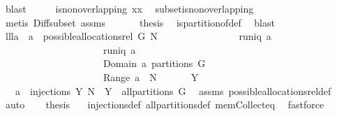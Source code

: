 \begin{isabellebody}
\ blast\isanewline
\ \ \isamarkupfalse%
\ \isamarkupfalse%
\ {\isachardoublequoteopen}is{\isacharunderscore}non{\isacharunderscore}overlapping\ {\isacharquery}xx{\isachardoublequoteclose}\ \isamarkupfalse%
\ subset{\isacharunderscore}is{\isacharunderscore}non{\isacharunderscore}overlapping\ \isamarkupfalse%
\ {\isacharparenleft}metis\ Diff{\isacharunderscore}subset\ assms{\isacharparenleft}{}{\isacharparenright}{\isacharparenright}\isanewline
\ \ \isamarkupfalse%
\isanewline
\ \ \isamarkupfalse%
\ {\isacharquery}thesis\ \isamarkupfalse%
\ is{\isacharunderscore}partition{\isacharunderscore}of{\isacharunderscore}def\ \isamarkupfalse%
\ blast\isanewline
{}\isamarkupfalse%
%
\endisatagproof
{\isafoldproof}%
%
\isadelimproof
\isanewline
%
\endisadelimproof
\isanewline
{}\isamarkupfalse%
\ lll{}{}a{\isacharcolon}\ \ {\isachardoublequoteopen}a\ {\isasymin}\ possible{\isacharunderscore}allocations{\isacharunderscore}rel\ G\ N{\isachardoublequoteclose}\ \isanewline
\ \ \ \ \ \ \ \ \ \ \ \ \ \ \ {\isachardoublequoteopen}runiq\ a\ {\isacharampersand}\ \isanewline
\ \ \ \ \ \ \ \ \ \ \ \ \ \ \ \ \ \ \ \ \ runiq\ {\isacharparenleft}a{\isasyminverse}{\isacharparenright}\ {\isacharampersand}\ \isanewline
\ \ \ \ \ \ \ \ \ \ \ \ \ \ \ \ \ \ \ \ \ {\isacharparenleft}Domain\ a{\isacharparenright}\ partitions\ G\ {\isacharampersand}\ \isanewline
\ \ \ \ \ \ \ \ \ \ \ \ \ \ \ \ \ \ \ \ \ Range\ a\ {\isasymsubseteq}\ N{\isachardoublequoteclose}\ \isanewline
%
\isadelimproof
%
\endisadelimproof
%
\isatagproof
{}\isamarkupfalse%
\ {\isacharminus}\isanewline
\ \ \isamarkupfalse%
\ Y\ \isanewline
\ \ {}{\isacharcolon}\ {\isachardoublequoteopen}a\ {\isasymin}\ injections\ Y\ N\ {\isacharampersand}\ Y\ {\isasymin}\ all{\isacharunderscore}partitions\ G{\isachardoublequoteclose}\ \isamarkupfalse%
\ assms\ possible{\isacharunderscore}allocations{\isacharunderscore}rel{\isacharunderscore}def\ \isamarkupfalse%
\ auto\isanewline
\ \ \isamarkupfalse%
\ {\isacharquery}thesis\ \isamarkupfalse%
\ {}\ injections{\isacharunderscore}def\ all{\isacharunderscore}partitions{\isacharunderscore}def\ mem{\isacharunderscore}Collect{\isacharunderscore}eq\ \isamarkupfalse%
\ fastforce\isanewline
{}\isamarkupfalse%

\end{isabellebody}
